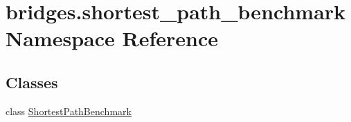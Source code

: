 \hypertarget{namespacebridges_1_1shortest__path__benchmark}{}\section{bridges.\+shortest\+\_\+path\+\_\+benchmark Namespace Reference}
\label{namespacebridges_1_1shortest__path__benchmark}
\subsection*{Classes}
\begin{DoxyCompactItemize}
\item 
class \mbox{\hyperlink{classbridges_1_1shortest__path__benchmark_1_1_shortest_path_benchmark}{Shortest\+Path\+Benchmark}}
\end{DoxyCompactItemize}
